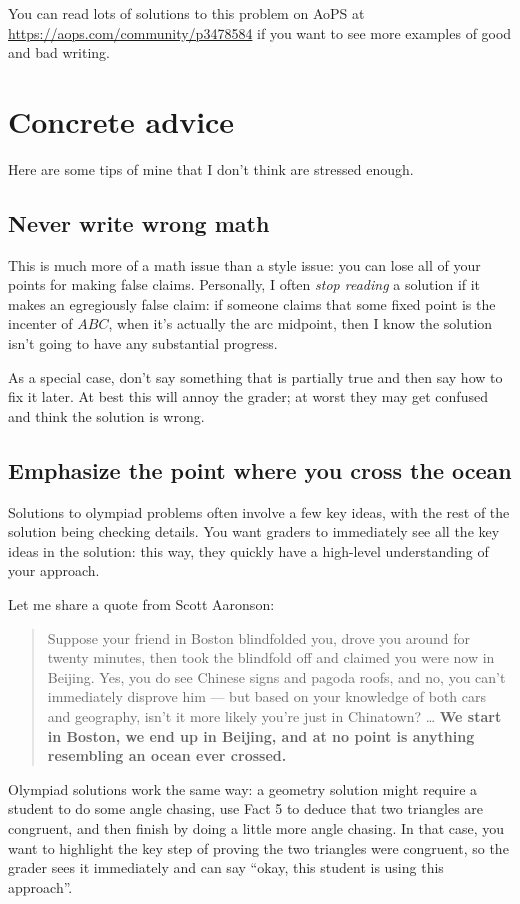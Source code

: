 \documentclass[11pt]{scrartcl}
\begin{document}
You can read lots of solutions to this problem on AoPS at
\url{https://aops.com/community/p3478584}
if you want to see more examples of good and bad writing.

\newpage

\section{Concrete advice}
Here are some tips of mine that I don't think are stressed enough.

\subsection{Never write wrong math}
This is much more of a math issue than a style issue:
you can lose all of your points for making false claims.
Personally, I often \emph{stop reading} a solution if it makes
an egregiously false claim: if someone claims that some fixed
point is the incenter of $ABC$,
when it's actually the arc midpoint,
then I know the solution isn't going to have any substantial progress.

As a special case, don't say something that is partially true
and then say how to fix it later.
At best this will annoy the grader;
at worst they may get confused and think the solution is wrong.

\subsection{Emphasize the point where you cross the ocean}
Solutions to olympiad problems often involve a few key ideas,
with the rest of the solution being checking details.
You want graders to immediately see all the key ideas in the solution:
this way, they quickly have a high-level understanding of your approach.

Let me share a quote from Scott Aaronson:
\begin{quote}
  Suppose your friend in Boston blindfolded you,
  drove you around for twenty minutes,
  then took the blindfold off and claimed you were now in Beijing.
  Yes, you do see Chinese signs and pagoda roofs,
  and no, you can't immediately disprove him ---
  but based on your knowledge of both cars and geography,
  isn't it more likely you're just in Chinatown?
  \dots
  \textbf{We start in Boston, we end up in Beijing,
  and at no point is anything resembling an ocean ever crossed.}
\end{quote}
Olympiad solutions work the same way:
a geometry solution might require a student to do some angle chasing,
use Fact 5 to deduce that two triangles are congruent,
and then finish by doing a little more angle chasing.
In that case, you want to highlight the key step of proving the two triangles
were congruent, so the grader sees it immediately and can say
``okay, this student is using this approach''.
\end{document}
